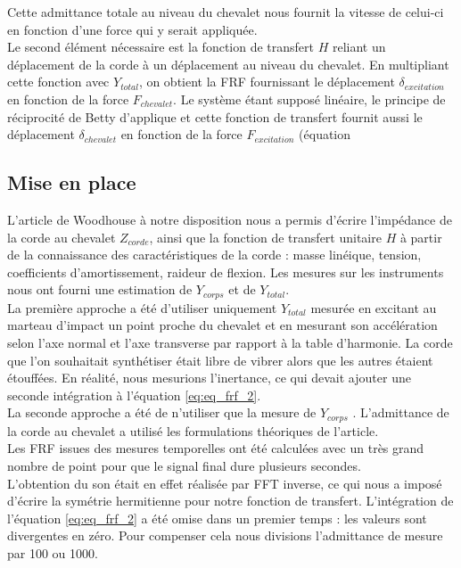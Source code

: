 Cette admittance totale au niveau du chevalet nous fournit la vitesse de
celui-ci en fonction d'une force qui y serait appliquée. \\

Le second élément nécessaire est la fonction de transfert $H$ reliant un
déplacement de la corde à un déplacement au niveau du chevalet. En multipliant
cette fonction avec $Y_{total}$, on obtient la FRF fournissant le déplacement
$\delta_{excitation}$ en fonction de la force $F_{chevalet}$. Le système étant
supposé linéaire, le principe de réciprocité de Betty d'applique et cette fonction de transfert fournit aussi le déplacement
$\delta_{chevalet}$ en fonction de la force $F_{excitation}$ (équation 


\subsection{Mise en place}

L'article de Woodhouse à notre disposition nous a permis d'écrire l'impédance
de la corde au chevalet $Z_{corde}$, ainsi que la fonction de transfert
unitaire $H$ à partir de la connaissance des caractéristiques de la corde :
masse linéique, tension, coefficients d'amortissement, raideur de flexion. Les
mesures sur les instruments nous ont fourni une estimation de $Y_{corps}$ et de
$Y_{total}$. \\

La première approche a été d'utiliser uniquement $Y_{total}$ mesurée en
excitant au marteau d'impact un point proche du chevalet et en mesurant son
accélération selon l'axe normal et l'axe transverse par rapport à la table
d'harmonie. La corde que l'on souhaitait synthétiser était libre de vibrer
alors que les autres étaient étouffées. En réalité, nous mesurions l'inertance,
ce qui devait ajouter une seconde intégration à l'équation \ref{eq:eq_frf_2}.\\

La seconde approche a été de n'utiliser que la mesure de $Y_{corps}$ .
L'admittance de la corde au chevalet a utilisé les formulations théoriques de
l'article. \\

Les FRF issues des mesures temporelles ont été calculées avec un très grand
nombre de point pour que le signal final dure plusieurs secondes.\\

L'obtention du son était en effet réalisée par FFT inverse, ce qui nous a
imposé d'écrire la symétrie hermitienne pour notre fonction de transfert.
L'intégration de l'équation \ref{eq:eq_frf_2} a été omise dans un premier temps
: les valeurs sont divergentes en zéro. Pour compenser cela nous divisions
l'admittance de mesure par 100 ou 1000.\\


